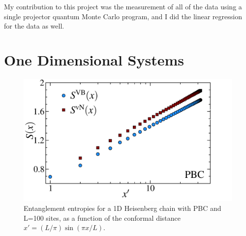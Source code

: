 My contribution to this project was the measurement of all of the \vb data using a single projector quantum Monte Carlo program, and I did the linear regression  for the \vb data as well.


\section{One Dimensional Systems}

\begin{figure} {
\includegraphics[width=5.5in]{./figures/paper1/figure1/thesis_pbc.pdf} 
\centering
\caption[1D Results for \vb with \vn using periodic boundaries]{
Entanglement entropies for a 1D Heisenberg chain with PBC and L=100 sites, as a function of the conformal distance $x'  = (L/\pi)\sin (\pi x/L)$.
\label{1dPBC}}
} 
\end{figure}

